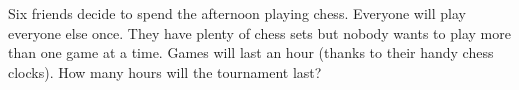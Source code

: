 \documentclass{book}
\begin{document}
\setcounter{cpjt}{47}
\addtocounter{cpjt}{-1}
\begin{activity}\label{activity-40}
\hypertarget{p-400}{}%
Six friends decide to spend the afternoon playing chess. Everyone will play everyone else once. They have plenty of chess sets but nobody wants to play more than one game at a time. Games will last an hour (thanks to their handy chess clocks). How many hours will the tournament last?%
\par\smallskip%
\noindent\end{activity}

\clearpage
\end{document}

